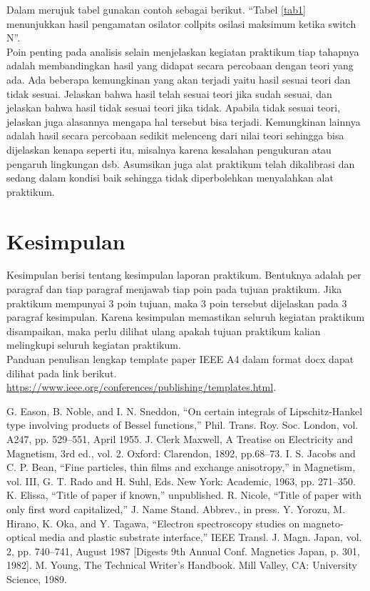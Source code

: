 \documentclass[conference]{IEEEtran}
\begin{document}
Dalam merujuk tabel gunakan contoh sebagai berikut. “Tabel \ref{tab1} menunjukkan hasil pengamatan osilator collpits osilasi maksimum ketika switch N”.\\

Poin penting pada analisis selain menjelaskan kegiatan praktikum tiap tahapnya adalah membandingkan hasil yang didapat secara percobaan dengan teori yang ada. Ada beberapa kemungkinan yang akan terjadi yaitu hasil sesuai teori dan tidak sesuai. Jelaskan bahwa hasil telah sesuai teori jika sudah sesuai, dan jelaskan bahwa hasil tidak sesuai teori jika tidak. Apabila tidak sesuai teori, jelaskan juga alasannya mengapa hal tersebut bisa terjadi. Kemungkinan lainnya adalah hasil secara percobaan sedikit melenceng dari nilai teori sehingga bisa dijelaskan kenapa seperti itu, misalnya karena kesalahan pengukuran atau pengaruh lingkungan dsb. Asumsikan juga alat praktikum telah dikalibrasi dan sedang dalam kondisi baik sehingga tidak diperbolehkan menyalahkan alat praktikum.

\section{Kesimpulan}
Kesimpulan berisi tentang kesimpulan laporan praktikum. Bentuknya adalah per paragraf dan tiap paragraf menjawab tiap poin pada tujuan praktikum. Jika praktikum mempunyai 3 poin tujuan, maka 3 poin tersebut dijelaskan pada 3 paragraf kesimpulan. Karena kesimpulan memastikan seluruh kegiatan praktikum disampaikan, maka perlu dilihat ulang apakah tujuan praktikum kalian melingkupi seluruh kegiatan praktikum.\\

Panduan penulisan lengkap template paper IEEE A4 dalam format docx dapat dilihat pada link berikut. \url{https://www.ieee.org/conferences/publishing/templates.html}.

%
\begin{thebibliography}{00}
 G. Eason, B. Noble, and I. N. Sneddon, ``On certain integrals of Lipschitz-Hankel type involving products of Bessel functions,'' Phil. Trans. Roy. Soc. London, vol. A247, pp. 529--551, April 1955.
 J. Clerk Maxwell, A Treatise on Electricity and Magnetism, 3rd ed., vol. 2. Oxford: Clarendon, 1892, pp.68--73.
 I. S. Jacobs and C. P. Bean, ``Fine particles, thin films and exchange anisotropy,'' in Magnetism, vol. III, G. T. Rado and H. Suhl, Eds. New York: Academic, 1963, pp. 271--350.
 K. Elissa, ``Title of paper if known,'' unpublished.
 R. Nicole, ``Title of paper with only first word capitalized,'' J. Name Stand. Abbrev., in press.
 Y. Yorozu, M. Hirano, K. Oka, and Y. Tagawa, ``Electron spectroscopy studies on magneto-optical media and plastic substrate interface,'' IEEE Transl. J. Magn. Japan, vol. 2, pp. 740--741, August 1987 [Digests 9th Annual Conf. Magnetics Japan, p. 301, 1982].
 M. Young, The Technical Writer's Handbook. Mill Valley, CA: University Science, 1989.
\end{thebibliography}\hfill\\
\end{document}
